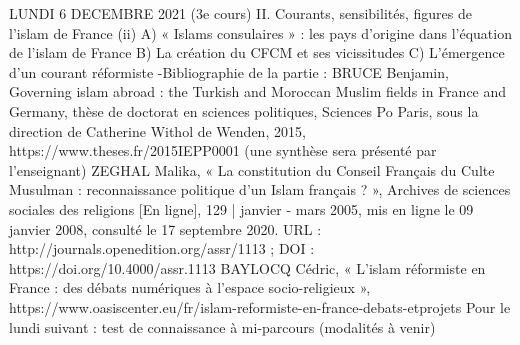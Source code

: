 LUNDI 6 DECEMBRE 2021 (3e
cours)
II. Courants, sensibilités, figures de l’islam de France (ii)
A) « Islams consulaires » : les pays d’origine dans l’équation de l’islam de
France
B) La création du CFCM et ses vicissitudes
C) L’émergence d’un courant réformiste
-Bibliographie de la partie :
BRUCE Benjamin, Governing islam abroad : the Turkish and Moroccan Muslim fields
in France and Germany, thèse de doctorat en sciences politiques, Sciences Po Paris,
sous la direction de Catherine Withol de Wenden, 2015,
https://www.theses.fr/2015IEPP0001 (une synthèse sera présenté par l’enseignant)
ZEGHAL Malika, « La constitution du Conseil Français du Culte Musulman :
reconnaissance politique d'un Islam français ? », Archives de sciences sociales des
religions [En ligne], 129 | janvier - mars 2005, mis en ligne le 09 janvier 2008, consulté
le 17 septembre 2020. URL : http://journals.openedition.org/assr/1113 ; DOI :
https://doi.org/10.4000/assr.1113
BAYLOCQ Cédric, « L’islam réformiste en France : des débats numériques à l’espace
socio-religieux », https://www.oasiscenter.eu/fr/islam-reformiste-en-france-debats-etprojets
Pour le lundi suivant : test de connaissance à mi-parcours (modalités à venir)